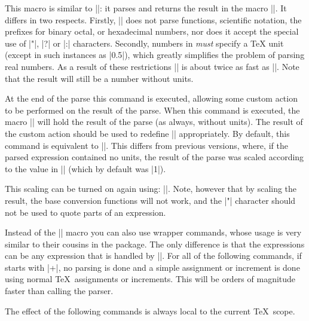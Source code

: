 \begin{command}{\pgfmathqparse{}}
    This macro is similar to |\pgfmathparse|: it parses  and
    returns the result in the macro |\pgfmathresult|. It differs in two
    respects. Firstly, |\pgfmathqparse| does not parse functions, scientific
    notation, the prefixes for binary octal, or hexadecimal numbers, nor does
    it accept the special use of |"|, |?| or |:| characters. Secondly, numbers
    in  \emph{must} specify a \TeX{} unit (except in such
    instances as |0.5\pgf@x|), which greatly simplifies the problem of parsing
    real numbers. As a result of these restrictions |\pgfmathqparse| is about
    twice as fast as |\pgfmathparse|. Note that the result will still be a
    number without units.
\end{command}

\begin{command}{\pgfmathpostparse}
    At the end of the parse this command is executed, allowing some custom
    action to be performed on the result of the parse. When this command is
    executed, the macro |\pgfmathresult| will hold the result of the parse (as
    always, without units). The result of the custom action should be used to
    redefine |\pgfmathresult| appropriately. By default, this command is
    equivalent to |\relax|. This differs from previous versions, where, if the
    parsed expression contained no units, the result of the parse was scaled
    according to the value in |\pgfmathresultunitscale| (which by default was
    |1|).

    This scaling can be turned on again using:
    |\let\pgfmathpostparse=\pgfmathscaleresult|. Note, however that by scaling
    the result, the base conversion functions will not work, and the |"|
    character should not be used to quote parts of an expression.
\end{command}

Instead of the |\pgfmathparse| macro you can also use wrapper commands, whose
usage is very similar to their cousins in the \calcname{} package. The only
difference is that the expressions can be any expression that is handled by
|\pgfmathparse|. For all of the following commands, if  starts
with |+|, no parsing is done and a simple assignment or increment is done using
normal \TeX\ assignments or increments. This will be orders of magnitude faster
than calling the parser.

The effect of the following commands is always local to the current \TeX\
scope.

